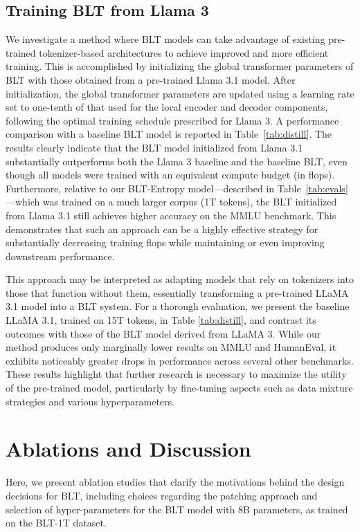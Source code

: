 \subsection{Training {\textsc BLT} from Llama 3}
\label{sec:distillation}
We investigate a method where {\textsc BLT} models can take advantage of existing pre-trained tokenizer-based architectures to achieve improved and more efficient training. This is accomplished by initializing the global transformer parameters of {\textsc BLT} with those obtained from a pre-trained Llama 3.1 model. After initialization, the global transformer parameters are updated using a learning rate set to one-tenth of that used for the local encoder and decoder components, following the optimal training schedule prescribed for Llama 3. A performance comparison with a baseline {\textsc BLT} model is reported in Table~\ref{tab:distill}. The results clearly indicate that the {\textsc BLT} model initialized from Llama 3.1 substantially outperforms both the Llama 3 baseline and the baseline {\textsc BLT}, even though all models were trained with an equivalent compute budget (in flops). Furthermore, relative to our {\textsc BLT}-Entropy model—described in Table~\ref{tab:evals}—which was trained on a much larger corpus (1T tokens), the {\textsc BLT} initialized from Llama 3.1 still achieves higher accuracy on the MMLU benchmark. This demonstrates that such an approach can be a highly effective strategy for substantially decreasing training flops while maintaining or even improving downstream performance.

This approach may be interpreted as adapting models that rely on tokenizers into those that function without them, essentially transforming a pre-trained LLaMA 3.1 model into a {\textsc BLT} system. For a thorough evaluation, we present the baseline LLaMA 3.1, trained on 15T tokens, in Table \ref{tab:distill}, and contrast its outcomes with those of the {\textsc BLT} model derived from LLaMA 3. While our method produces only marginally lower results on MMLU and HumanEval, it exhibits noticeably greater drops in performance across several other benchmarks. These results highlight that further research is necessary to maximize the utility of the pre-trained model, particularly by fine-tuning aspects such as data mixture strategies and various hyperparameters.

\section{Ablations and Discussion}
\label{section:ablations}
Here, we present ablation studies that clarify the motivations behind the design decisions for {\textsc BLT}, including choices regarding the patching approach and selection of hyper-parameters for the {\textsc BLT} model with 8B parameters, as trained on the {\textsc BLT}-1T dataset.

